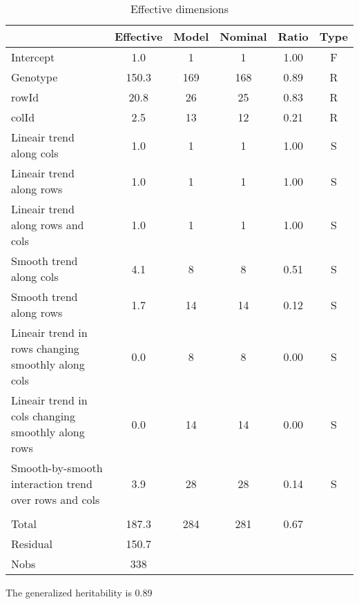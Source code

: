 \documentclass[a4paper,11pt]{article}\usepackage[]{graphicx}\usepackage[]{color}
\begin{document}
\newpage
\begin{table}[ht]
\begin{flushleft}
\caption{Effective dimensions} 
\label{effDims}
\begin{tabular}{lccccc}
  \hline
 & Effective & Model & Nominal & Ratio & Type \\ 
  \hline
Intercept & 1.0 & 1 & 1 & 1.00 & F \\ 
  Genotype & 150.3 & 169 & 168 & 0.89 & R \\ 
  rowId & 20.8 & 26 & 25 & 0.83 & R \\ 
  colId & 2.5 & 13 & 12 & 0.21 & R \\ 
  Lineair trend along cols & 1.0 & 1 & 1 & 1.00 & S \\ 
  Lineair trend along rows & 1.0 & 1 & 1 & 1.00 & S \\ 
  Lineair trend along rows and cols & 1.0 & 1 & 1 & 1.00 & S \\ 
  Smooth trend along cols & 4.1 & 8 & 8 & 0.51 & S \\ 
  Smooth trend along rows & 1.7 & 14 & 14 & 0.12 & S \\ 
  Lineair trend in rows changing smoothly along cols & 0.0 & 8 & 8 & 0.00 & S \\ 
  Lineair trend in cols changing smoothly along rows & 0.0 & 14 & 14 & 0.00 & S \\ 
  Smooth-by-smooth interaction trend over rows and cols & 3.9 & 28 & 28 & 0.14 & S \\ 
   &  &  &  &  &  \\ 
  Total & 187.3 & 284 & 281 & 0.67 &  \\ 
  Residual & 150.7 &  &  &  &  \\ 
  Nobs & 338 &  &  &  &  \\ 
   \hline
\end{tabular}
\end{flushleft}
\end{table}
The generalized heritability is 0.89%
\end{document}
